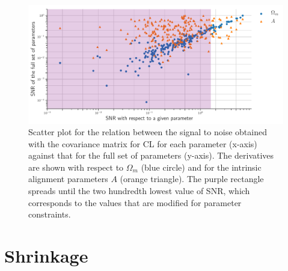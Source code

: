 \documentclass[twocolumn]{\docclass}
\begin{document}
	\begin{figure}
		\includegraphics[width=1\columnwidth]{SNR/SNR_200_omA.pdf}
		\caption{Scatter plot for the relation between the signal to noise obtained with the covariance matrix for CL for each parameter (x-axis) against that for the full set of parameters (y-axis). The derivatives are shown with respect to $\Omega_m$ (blue circle) and for the intrinsic alignment parameters $A$ (orange triangle). The purple rectangle spreads until the two hundredth lowest value of SNR, which corresponds to the values that are modified for parameter constraints. \label{fig:signalnoise_cuts}}
	\end{figure}
	
	
	
	\section{Shrinkage}
	\label{subsec:shrinkage}
	
	
\end{document}
